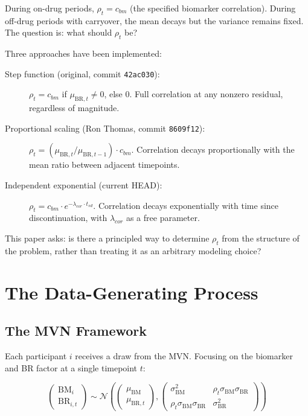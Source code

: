 \documentclass[11pt]{article}
\begin{document}
During on-drug periods, $\rho_t = c_{bm}$ (the specified
biomarker correlation). During off-drug periods with carryover,
the mean decays but the variance remains fixed. The question is:
what should $\rho_t$ be?

Three approaches have been implemented:

\begin{description}
\item[Step function (original, commit \texttt{42ac030}):]
  $\rho_t = c_{bm}$ if $\mu_{\text{BR},t} \neq 0$, else 0.
  Full correlation at any nonzero residual, regardless of
  magnitude.

\item[Proportional scaling (Ron Thomas, commit
  \texttt{8609f12}):] $\rho_t = (\mu_{\text{BR},t} /
  \mu_{\text{BR},t-1}) \cdot c_{bm}$. Correlation decays
  proportionally with the mean ratio between adjacent
  timepoints.

\item[Independent exponential (current HEAD):]
  $\rho_t = c_{bm} \cdot e^{-\lambda_{cor} \cdot t_{sd}}$.
  Correlation decays exponentially with time since
  discontinuation, with $\lambda_{cor}$ as a free parameter.
\end{description}

This paper asks: is there a principled way to determine
$\rho_t$ from the structure of the problem, rather than
treating it as an arbitrary modeling choice?

\section{The Data-Generating Process}

\subsection{The MVN Framework}

Each participant $i$ receives a draw from the MVN. Focusing on
the biomarker and BR factor at a single timepoint $t$:

\[
\begin{pmatrix} \text{BM}_i \\ \text{BR}_{i,t} \end{pmatrix}
\sim \mathcal{N}\!\left(
\begin{pmatrix} \mu_{\text{BM}} \\ \mu_{\text{BR},t}
\end{pmatrix},
\begin{pmatrix}
\sigma_{\text{BM}}^2 &
  \rho_t \sigma_{\text{BM}} \sigma_{\text{BR}} \\
\rho_t \sigma_{\text{BM}} \sigma_{\text{BR}} &
  \sigma_{\text{BR}}^2
\end{pmatrix}
\right)
\]
\end{document}
